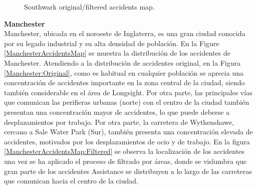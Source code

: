 \documentclass{uathesis-es}
\begin{document}
\begin{figure}[H]
{         \label{SouthwarkAccidentsMap:Filtered}
     }
     \caption{Southwark original/filtered accidents map.}
     \label{SouthwarkAccidentsMap}
 \end{figure}


\textbf{Manchester}\\

Manchester, ubicada en el noroeste de Inglaterra, es una gran ciudad conocida por su legado industrial y su alta densidad de población. En la Figure \ref{ManchesterAccidentsMap} se muestra la distribución de los accidentes de Manchester. Atendiendo a la distribución de accidentes original, en la Figura \ref{Manchester:Original}, como es habitual en cualquier población se aprecia una concentración de accidentes importante en la zona central de la ciudad, siendo también considerable en el área de Longsight. Por otra parte, las principales vías que comunican las perifieras urbanas (norte) con el centro de la ciudad también presentan una concentración mayor de accidentes, lo que puede deberse a desplazamientos por trabajo. Por otra parte, la carretera de Wythenshawe, cercano a Sale Water Park (Sur), también presenta una concentración elevada de accidentes, motivados por los desplazamientos de ocio y de trabajo. En la figura \ref{ManchesterAccidentsMap:Filtered} se observa la localización de los accidentes una vez se ha aplicado el proceso de filtrado por áreas, donde se vislumbra que gran parte de los accidentes Assistance se distribuyen a lo largo de las carreteras que comunican hacia el centro de la ciudad.
\end{document}
